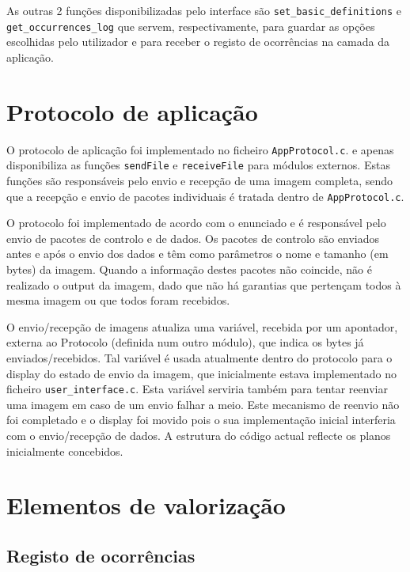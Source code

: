 \documentclass[11pt,a4paper,reqno]{report}
\numberwithin{equation}{section}
\begin{document}
As outras 2 funções disponibilizadas pelo interface são \verb|set_basic_definitions| e \verb|get_occurrences_log| que servem, respectivamente, para guardar as opções escolhidas pelo utilizador e para receber o registo de ocorrências na camada da aplicação.


\chapter{Protocolo de aplicação}

O protocolo de aplicação foi implementado no ficheiro \verb|AppProtocol.c|. e apenas disponibiliza as funções \verb|sendFile| e \verb|receiveFile| para módulos externos. Estas funções são responsáveis pelo envio e recepção de uma imagem completa, sendo que a recepção e envio de pacotes individuais é tratada dentro de \verb|AppProtocol.c|.

O protocolo foi implementado de acordo com o enunciado e é responsável pelo envio de pacotes de controlo e de dados.
Os pacotes de controlo são enviados antes e após o envio dos dados e têm como parâmetros o nome e tamanho (em bytes) da imagem.
Quando a informação destes pacotes não coincide, não é realizado o output da imagem, dado que não há garantias que pertençam todos à mesma imagem ou que todos foram recebidos.

O envio/recepção de imagens atualiza uma variável, recebida por um apontador, externa ao Protocolo (definida num outro módulo), que indica os bytes já enviados/recebidos. Tal variável é usada atualmente dentro do protocolo para o display do estado de envio da imagem, que inicialmente estava implementado no ficheiro \verb|user_interface.c|. Esta variável serviria também para tentar reenviar uma imagem em caso de um envio falhar a meio. Este mecanismo de reenvio não foi completado e o display foi movido pois o sua implementação inicial interferia com o envio/recepção de dados. A estrutura do código actual reflecte os planos inicialmente concebidos.

\chapter{Elementos de valorização}

\section{Registo de ocorrências}
\end{document}
